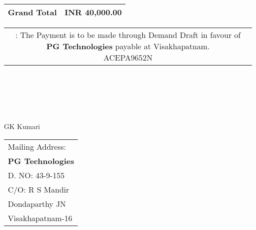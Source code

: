 \documentclass[11pt]{article}
\begin{document}
\vspace*{0.45cm}

\hspace*{11.8cm}
\begin{tabular}{|c|r|}
\hline
{\bf Grand Total} & INR 40,000.00 \\
\hline
\end{tabular}

\vspace*{-0.45cm}
\hspace*{-0.65cm}
\begin{tabular}{c}
\parbox{4in}{ : The Payment is to be made through Demand Draft in favour of {\bf PG Technologies} payable at Visakhapatnam. \\
 ACEPA9652N}\\
\end{tabular}
\vspace*{95pt}


 \\ \\ \\ \\ \\
 \hspace*{0.2cm}GK Kumari
\vspace*{-71pt}
\begin{flushright}
\begin{tabular}{l}
Mailing Address:\\
{\bf PG Technologies}\\
D. NO: 43-9-155\\
C/O: R  S Mandir\\
Dondaparthy JN\\ 
Visakhapatnam-16\\
\end{tabular}
\end{flushright}
\end{document}
